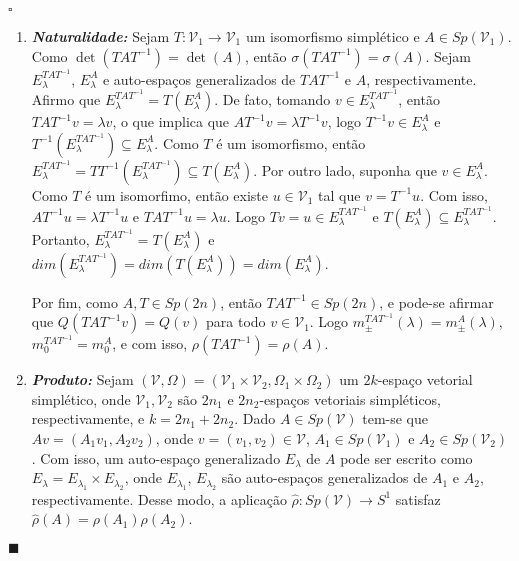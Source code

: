 \documentclass[12pt]{book}
\newenvironment{prova}[1]{$\square$ #1}{\hfill$\blacksquare$}
\newcommand{\autoespaco}[1]{E_{#1}}
\newcommand{\circulo}{S^{1}}
\newcommand{\complexificado}[1]{\mathcal{#1}}
\newcommand{\espectrooperador}[1]{\sigma(#1)}
\newcommand{\gruposimpletico}[1]{Sp(#1)}
\begin{document}
	\begin{prova}
		
		\begin{enumerate}
			\item \label{item_naturalidade_rho} \textbf{\textit{Naturalidade:}} Sejam $T : \complexificado{V}_{1} \to \complexificado{V}_{1}$ um isomorfismo simplético e $A \in \gruposimpletico{\complexificado{V}_{1}}$. Como $\det(TAT^{-1}) = \det(A)$, então $\espectrooperador{TAT^{-1}} = \espectrooperador{A}$. Sejam $\autoespaco{\lambda}^{TAT^{-1}}$, $\autoespaco{\lambda}^{A}$ e auto-espaços generalizados de $TAT^{-1}$ e $A$, respectivamente. Afirmo que $\autoespaco{\lambda}^{TAT^{-1}} = T(\autoespaco{\lambda}^{A})$. De fato, tomando $v \in \autoespaco{\lambda}^{TAT^{-1}}$, então $TAT^{-1}v = \lambda v$, o que implica que $AT^{-1}v = \lambda T^{-1}v$, logo $T^{-1}v \in \autoespaco{\lambda}^{A}$ e $T^{-1}(\autoespaco{\lambda}^{TAT^{-1}}) \subseteq \autoespaco{\lambda}^{A}$. Como $T$ é um isomorfismo, então $\autoespaco{\lambda}^{TAT^{-1}} = TT^{-1}(\autoespaco{\lambda}^{TAT^{-1}}) \subseteq T(\autoespaco{\lambda}^{A})$. Por outro lado, suponha que $v\in \autoespaco{\lambda}^{A}$. Como $T$ é um isomorfimo, então existe $u \in \complexificado{V}_{1}$ tal que $v=T^{-1}u$. Com isso, $AT^{-1}u = \lambda T^{-1}u$ e $ TAT^{-1}u =\lambda u$. Logo $Tv=u \in \autoespaco{\lambda}^{TAT^{-1}}$ e $T(\autoespaco{\lambda}^{A}) \subseteq \autoespaco{\lambda}^{TAT^{-1}}$. Portanto, $\autoespaco{\lambda}^{TAT^{-1}}=T(\autoespaco{\lambda}^{A}) $ e $dim(\autoespaco{\lambda}^{TAT^{-1}})=dim(T(\autoespaco{\lambda}^{A}) )=dim(\autoespaco{\lambda}^{A})$.
			
			Por fim, como $A,T\in \gruposimpletico{2n}$, então $TAT^{-1}\in \gruposimpletico{2n}$, e pode-se afirmar que $Q(TAT^{-1}v) = Q(v)$ para todo $v \in \complexificado{V}_{1}$. Logo  $m^{TAT^{-1}}_{\pm}(\lambda)=m^{A}_{\pm}(\lambda)$, $m_{0}^{TAT^{-1}}=m_{0}^{A}$, e com isso, $\rho(TAT^{-1})=\rho(A)$.
			
			\item \textbf{\textit{Produto:}} Sejam $(\complexificado{V}, \Omega) = (\complexificado{V}_{1}\times \complexificado{V}_{2}, \Omega_{1}\times \Omega_{2})$ um $2k$-espaço vetorial simplético, onde $\complexificado{V}_{1}, \complexificado{V}_{2}$ são $2n_{1}$ e $2n_{2}$-espaços vetoriais simpléticos, respectivamente, e $k=2n_{1}+2n_{2}$. Dado $A \in \gruposimpletico{\complexificado{V}}$ tem-se que $Av = (A_{1}v_{1}, A_{2}v_{2})$, onde $v=(v_{1}, v_{2}) \in \complexificado{V}$, $A_{1}\in \gruposimpletico{\complexificado{V}_{1}}$ e $A_{2}\in \gruposimpletico{\complexificado{V}_{2}}$. Com isso, um auto-espaço generalizado $E_{\lambda}$ de $A$ pode ser escrito como $E_{\lambda} = E_{\lambda_{1}}\times E_{\lambda_{2}}$, onde $E_{\lambda_{1}}$, $E_{\lambda_{2}}$ são auto-espaços generalizados de $A_{1}$ e $A_{2}$, respectivamente. Desse modo, a aplicação $\hat{\rho}: \gruposimpletico{\complexificado{V}} \to \circulo$ satisfaz $\hat{\rho}(A) = \rho(A_{1})\rho(A_{2})$.
			

\end{enumerate}
\end{prova}
\end{document}
